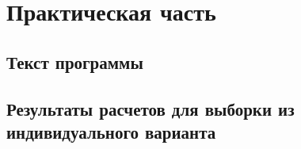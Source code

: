 \chapter{Практическая часть}

\section{Текст программы}


\section{Результаты расчетов для выборки из индивидуального варианта}


